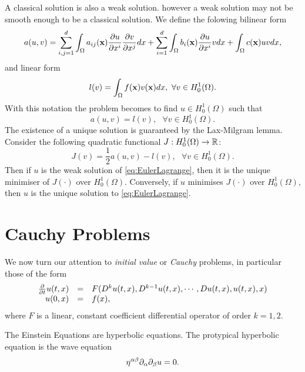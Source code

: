 A classical solution is also a weak solution. however a weak solution may not be smooth enough to be a classical solution. We define the folowing bilinear form
\begin{equation}
a(u,v)=\sum^d_{i,j=1} \int_{\Omega} a_{ij}(\mathbf{x}) \frac{{\partial} u}{{\partial} x^i}\frac{{\partial} v}{{\partial} x^j}dx + \sum^d_{i=1} \int_{\Omega} b_{i}(\mathbf{x}) \frac{{\partial} u}{{\partial} x^i}vdx+ \int_{\Omega} c(\mathbf{x})u v dx,
\end{equation}
and linear form 
\begin{equation}
l(v)=\int_{\Omega} f(\mathbf{x})v(\mathbf{x})dx, \mbox{  } \forall v \in H^1_0(\Omega).
\end{equation}
With this notation the problem becomes to find $u\in H^1_0(\Omega)$ such that 
\begin{equation}
\label{eq:EulerLagrange}
a(u,v)=l(v), \mbox{  } \forall v \in H^1_0(\Omega).
\end{equation}
The existence of a unique solution is guaranteed by the Lax-Milgram lemma. Consider the following quadratic functional $J:H^1_0(\Omega)\rightarrow \mathbb{R}$:
\begin{equation}
J(v)=\frac{1}{2} a(u,v)-l(v), \mbox{  } \forall v \in H^1_0(\Omega).
\end{equation}
Then if $u$ is the weak solution of \ref{eq:EulerLagrange}, then it is the unique minimiser of $J(\cdot)$ over $H^1_0(\Omega)$. Conversely, if $u$ minimises $J(\cdot)$ over $H^1_0(\Omega)$, then $u$ is the unique solution to \ref{eq:EulerLagrange}. 

\section{Cauchy Problems}
We now turn our attention to \textit{initial value} or \textit{Cauchy} problems, in particular those of the form 
\begin{equation}
\begin{array}{rcl}
\frac{{\partial}}{{\partial} t}u(t,x) & = & F(D^k u(t,x), D^{k-1} u(t,x), \cdots, D u(t,x), u(t,x), x)\\
u(0,x) & = & f(x),
\end{array}
\end{equation}
where $F$ is a linear, constant coefficient differential operator of order $k=1,2$. 


The Einstein Equations are hyperbolic equations. The protypical hyperbolic equation is the wave equation
\begin{equation}
\label{eq:Wave}
\eta^{{\alpha} \beta}{\partial}_{{\alpha}} {\partial}_{\beta} u = 0.
\end{equation}
